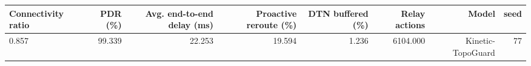 \begin{tabular}{lrrrrrrr}
\toprule
Connectivity ratio & PDR (\%) & Avg. end-to-end delay (ms) & Proactive reroute (\%) & DTN buffered (\%) & Relay actions & Model & seed \\
\midrule
0.857 & 99.339 & 22.253 & 19.594 & 1.236 & 6104.000 & Kinetic-TopoGuard & 77 \\
\bottomrule
\end{tabular}